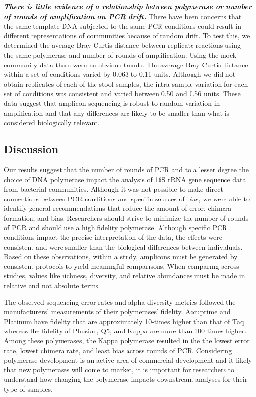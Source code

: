\documentclass[11pt,]{article}
\begin{document}
\textbf{\emph{There is little evidence of a relationship between
polymerase or number of rounds of amplification on PCR drift.}} There
have been concerns that the same template DNA subjected to the same PCR
conditions could result in different representations of communities
because of random drift. To test this, we determined the average
Bray-Curtis distance between replicate reactions using the same
polymerase and number of rounds of amplification. Using the mock
community data there were no obvious trends. The average Bray-Curtis
distance within a set of conditions varied by 0.063 to 0.11 units.
Although we did not obtain replicates of each of the stool samples, the
intra-sample variation for each set of conditions was consistent and
varied between 0.50 and 0.56 units. These data suggest that amplicon
sequencing is robust to random variation in amplification and that any
differences are likely to be smaller than what is considered
biologically relevant.

\newpage

\hypertarget{discussion}{%
\subsection{Discussion}\label{discussion}}

Our results suggest that the number of rounds of PCR and to a lesser
degree the choice of DNA polymerase impact the analysis of 16S rRNA gene
sequence data from bacterial communities. Although it was not possible
to make direct connections between PCR conditions and specific sources
of bias, we were able to identify general recommendations that reduce
the amount of error, chimera formation, and bias. Researchers should
strive to minimize the number of rounds of PCR and should use a high
fidelity polymerase. Although specific PCR conditions impact the precise
interpretation of the data, the effects were consistent and were smaller
than the biological differences between individuals. Based on these
observations, within a study, amplicons must be generated by consistent
protocols to yield meaningful comparisons. When comparing across
studies, values like richness, diversity, and relative abundances must
be made in relative and not absolute terms.

The observed sequencing error rates and alpha diversity metrics followed
the manufacturers' measurements of their polymerases' fidelity.
Accuprime and Platinum have fidelity that are approximately 10-times
higher than that of Taq whereas the fidelity of Phusion, Q5, and Kappa
are more than 100 times higher. Among these polymerases, the Kappa
polymerase resulted in the the lowest error rate, lowest chimera rate,
and least bias across rounds of PCR. Considering polymerase development
is an active area of commercial development and it likely that new
polymerases will come to market, it is important for researchers to
understand how changing the polymerase impacts downstream analyses for
their type of samples.
\end{document}
